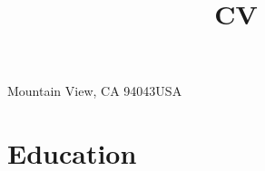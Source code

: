 \documentclass[11pt,a4paper,sans]{moderncv}        %
\begin{document}
%
%
%
%


\title{CV}  %
\address{365 Walker Dr.}{Mountain View, CA 94043}{USA}%
\makecvtitle

\section{Education}

\iffalse
\section{Ph.D Thesis}
\cvitem{Title}{\emph{Design for  Staged Two Beam Acceleration at the Argonne Wakefield Accelerator}}
\cvitem{Advisors}{Linda Spentzouris, John Power}
\cvitem{Summary}{
	I discuss beam line design, simulation, and optimization, of a
	beam line with the potential for dielectric two beam acceleration.
    Preliminary and prepratory experimental measurements
    are included.    }
\fi
\end{document}
